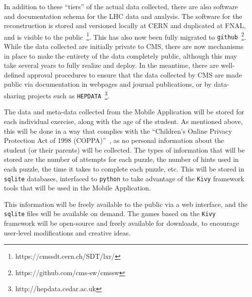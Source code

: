\documentclass[12pt]{proposalnsf}
\begin{document}
In addition to these ``tiers'' of the actual data collected, there are
also software and documentation schema for the LHC data and analysis. 
The software for the reconstruction is stored and versioned locally at
CERN and duplicated at FNAL, and is visible to the
public~\footnote{https://cmssdt.cern.ch/SDT/lxr/}. This has also now
been fully migrated to {\tt github}~\footnote{https://github.com/cms-sw/cmssw}.  
While the data collected are initially
private to CMS, there are now mechanisms in place to make the entirety
of the data completely public, although this may take several years to
fully realize and deploy. In the meantime, there are well-defined
approval procedures to ensure that the data collected by CMS are made
public via documentation in webpages and journal publications, or by
data-sharing projects such as 
{\tt HEPDATA}~\footnote{http://hepdata.cedar.ac.uk}. 


\bigskip
{}
\bigskip

The data and meta-data collected from the Mobile Application will be
stored for each individual exercise, along with the age of the
student. As mentioned above, this will be done in a way that complies
with the ``Children's Online Privacy Protection Act of 1998
(COPPA)''~\cite{coppa}, as no personal information about the student
(or their parents) will be collected. The types of information that
will be stored are the number of attempts for each puzzle, the number
of hints used in each puzzle, the time it takes to complete each
puzzle, etc. This will be stored in {\tt sqlite} databases, interfaced
to {\tt python} to take advantage of the {\tt Kivy} framework tools
that will be used in the Mobile Application. 

This information will be freely available to the public via a web
interface, and the {\tt sqlite} files will be available on demand. The
games based on the {\tt Kivy} framework will be open-source and freely
available for downloads, to encourage user-level modifications and
creative ideas. 
\end{document}
